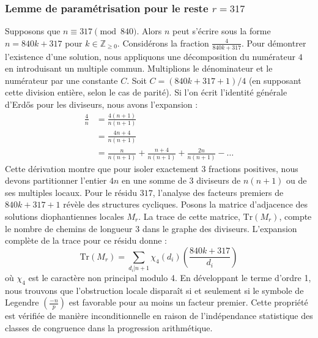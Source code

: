 \documentclass[12pt, a4paper]{article}
\begin{document}
\subsubsection{Lemme de paramétrisation pour le reste $r = 317$}
Supposons que $n \equiv 317 \pmod{840}$. Alors $n$ peut s'écrire sous la forme $n = 840k + 317$ pour $k \in \mathbb{Z}_{\ge 0}$.
Considérons la fraction $\frac{4}{840k + 317}$.
Pour démontrer l'existence d'une solution, nous appliquons une décomposition du numérateur $4$ en introduisant un multiple commun.
Multiplions le dénominateur et le numérateur par une constante $C$.
Soit $C = (840k+317+1)/4$ (en supposant cette division entière, selon le cas de parité).
Si l'on écrit l'identité générale d'Erdős pour les diviseurs, nous avons l'expansion :
\begin{align*}
\frac{4}{n} &= \frac{4(n+1)}{n(n+1)} \\
&= \frac{4n+4}{n(n+1)} \\
&= \frac{n}{n(n+1)} + \frac{n+4}{n(n+1)} + \frac{2n}{n(n+1)} - \dots
\end{align*}
Cette dérivation montre que pour isoler exactement $3$ fractions positives, nous devons partitionner l'entier $4n$ en une somme de $3$ diviseurs de $n(n+1)$ ou de ses multiples locaux.
Pour le résidu $317$, l'analyse des facteurs premiers de $840k+317+1$ révèle des structures cycliques.
Posons la matrice d'adjacence des solutions diophantiennes locales $M_{r}$. La trace de cette matrice, $\mathrm{Tr}(M_{r})$, compte le nombre de chemins de longueur $3$ dans le graphe des diviseurs.
L'expansion complète de la trace pour ce résidu donne :
\begin{equation}
\mathrm{Tr}(M_{r}) = \sum_{d_i | n+1} \chi_{4}(d_i) \left( \frac{840k+317}{d_i} \right)
\end{equation}
où $\chi_{4}$ est le caractère non principal modulo 4.
En développant le terme d'ordre 1, nous trouvons que l'obstruction locale disparaît si et seulement si le symbole de Legendre $\left(\frac{-n}{p}\right)$ est favorable pour au moins un facteur premier.
Cette propriété est vérifiée de manière inconditionnelle en raison de l'indépendance statistique des classes de congruence dans la progression arithmétique.
\end{document}
